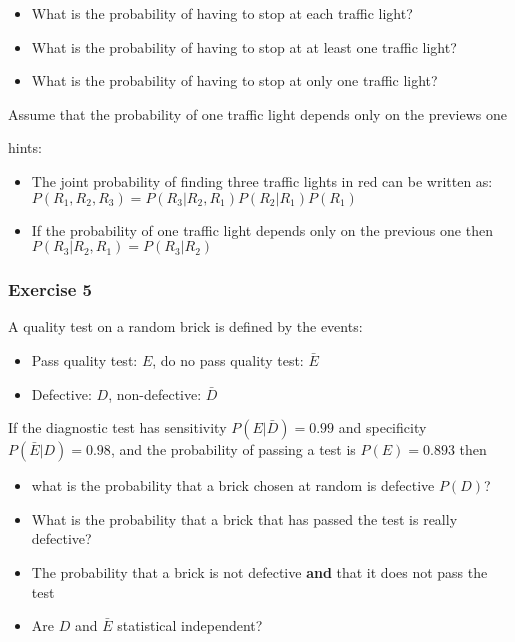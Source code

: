 \documentclass[
]{book}
\providecommand{\tightlist}{%
  \setlength{\itemsep}{0pt}\setlength{\parskip}{0pt}}
\begin{document}
\begin{itemize}
\tightlist
\item
  What is the probability of having to stop at each traffic light?
\item
  What is the probability of having to stop at at least one traffic light?
\item
  What is the probability of having to stop at only one traffic light?
\end{itemize}

Assume that the probability of one traffic light depends only on the previews one

hints:

\begin{itemize}
\item
  The joint probability of finding three traffic lights in red can be written as:
  \(P(R_1,R_2,R_3)=P(R_3|R_2,R_1)P(R_2|R_1)P(R_1)\)
\item
  If the probability of one traffic light depends only on the previous one then
  \(P(R_3|R_2,R_1)=P(R_3|R_2)\)
\end{itemize}

\hypertarget{exercise-5}{%
\subsubsection{Exercise 5}\label{exercise-5}}

A quality test on a random brick is defined by the events:

\begin{itemize}
\tightlist
\item
  Pass quality test: \(E\), do no pass quality test: \(\bar{E}\)
\item
  Defective: \(D\), non-defective: \(\bar{D}\)
\end{itemize}

If the diagnostic test has sensitivity \(P(E|\bar{D})=0.99\) and specificity \(P(\bar{E}|D)=0.98\), and the probability of passing a test is \(P(E)=0.893\) then

\begin{itemize}
\item
  what is the probability that a brick chosen at random is defective \(P(D)\)?
\item
  What is the probability that a brick that has passed the test is really defective?
\item
  The probability that a brick is not defective \textbf{and} that it does not pass the test
\item
  Are \(D\) and \(\bar{E}\) statistical independent?
\end{itemize}
\end{document}
